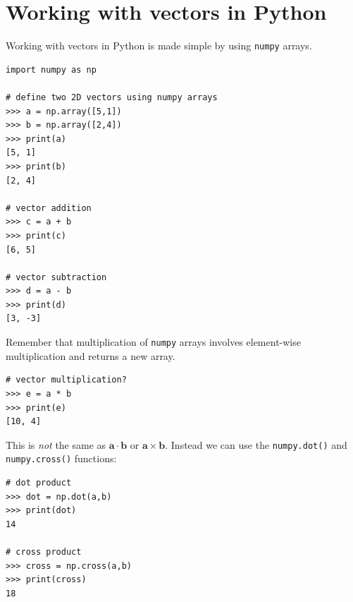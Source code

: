 \documentclass[a4paper]{article}
\newcommand{\bvec}[1]{\mathbf{#1}}
\begin{document}
\section{Working with vectors in Python}
Working with vectors in Python is made simple by using \texttt{numpy} arrays.
\begin{lstlisting}
import numpy as np

# define two 2D vectors using numpy arrays
>>> a = np.array([5,1])
>>> b = np.array([2,4])
>>> print(a)
[5, 1]
>>> print(b)
[2, 4]

# vector addition
>>> c = a + b
>>> print(c)
[6, 5]

# vector subtraction
>>> d = a - b
>>> print(d)
[3, -3]
\end{lstlisting}
Remember that multiplication of \texttt{numpy} arrays involves element-wise multiplication and returns a new array.
\begin{lstlisting}
# vector multiplication?
>>> e = a * b
>>> print(e)
[10, 4]
\end{lstlisting}
This is \emph{not} the same as $\bvec{a}\cdot\bvec{b}$ or $\bvec{a}\times\bvec{b}$. Instead we can use the \texttt{numpy.dot()} and \texttt{numpy.cross()} functions:
\begin{lstlisting}
# dot product
>>> dot = np.dot(a,b)
>>> print(dot)
14

# cross product
>>> cross = np.cross(a,b)
>>> print(cross)
18
\end{lstlisting}

\vspace{\baselineskip}
\begin{center}
  \noindent{}
\end{center}
\end{document}
